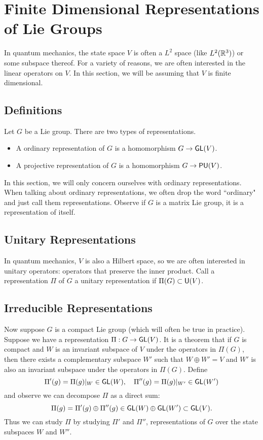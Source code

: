 \section{Finite Dimensional Representations of Lie Groups}
In quantum mechanics, the state space $V$ is often a $L^2$ space (like $L^2({\mathbb R}^3)$) or some subspace thereof. For a variety of reasons, we are often interested in the linear operators on $V$. In this section, we will be assuming that $V$ is finite dimensional.

\subsection{Definitions}
Let $G$ be a Lie group. There are two types of representations.
\begin{itemize}
    \item A ordinary representation of $G$ is a homomorphism $G \rightarrow \operatorname{\textsf{GL}}(V)$.
    \item A projective representation of $G$ is a homomorphism $G \rightarrow \operatorname{\textsf{PU}}(V)$.
\end{itemize}
In this section, we will only concern ourselves with ordinary representations. When talking about ordinary representations, we often drop the word ``ordinary" and just call them representations. Observe if $G$ is a matrix Lie group, it is a representation of itself.

\subsection{Unitary Representations}
In quantum mechanics, $V$ is also a Hilbert space, so we are often interested in unitary operators: operators that preserve the inner product. Call a representation $\Pi$ of $G$ a unitary representation if $\Pi(G) \subset \operatorname{\textsf{U}}(V)$.

\subsection{Irreducible Representations}
Now suppose $G$ is a compact Lie group (which will often be true in practice). Suppose we have a representation $\Pi: G \rightarrow \operatorname{\textsf{GL}}(V)$. It is a theorem that if $G$ is compact and $W$ is an invariant subspace of $V$ under the operators in $\Pi(G)$, then there exists a complementary subspace $W'$ such that $W \oplus W' = V$ and $W'$ is also an invariant subspace under the operators in $\Pi(G)$. Define
\[
    \Pi'(g) = \Pi(g)|_W \in \operatorname{\textsf{GL}}(W), \quad \Pi''(g) = \Pi(g)|_{W'} \in \operatorname{\textsf{GL}}(W')
\]
and observe we can decompose $\Pi$ as a direct sum:
\[
    \Pi(g) = \Pi'(g) \oplus \Pi''(g) \in \operatorname{\textsf{GL}}(W) \oplus \operatorname{\textsf{GL}}(W') \subset \operatorname{\textsf{GL}}(V).
\]
Thus we can study $\Pi$ by studying $\Pi'$ and $\Pi''$, representations of $G$ over the state subspaces $W$ and $W''$.

